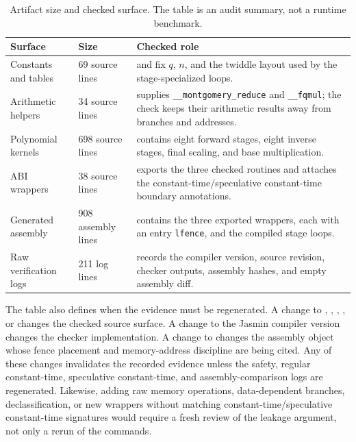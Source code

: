 \documentclass[10pt,twocolumn]{article}
\newcommand{\jasmin}{Jasmin}
\newcommand{\ct}{constant-time}
\newcommand{\sct}{speculative constant-time}
\begin{document}
\begin{table}[t]
\centering
\scriptsize
\setlength{\tabcolsep}{3pt}
\begin{tabular}{P{0.25\columnwidth}P{0.18\columnwidth}P{0.47\columnwidth}}
\toprule
Surface & Size & Checked role \\
\midrule
Constants and tables & 69 source lines &
 and  fix \(q\), \(n\), and the twiddle
layout used by the stage-specialized loops. \\
Arithmetic helpers & 34 source lines &
 supplies \texttt{\_\_montgomery\_reduce} and
\texttt{\_\_fqmul}; the check keeps their arithmetic results away from branches
and addresses. \\
Polynomial kernels & 698 source lines &
 contains eight forward stages, eight inverse stages, final
scaling, and base multiplication. \\
ABI wrappers & 38 source lines &
 exports the three checked routines and attaches the
\ct{}/\sct{} boundary annotations. \\
Generated assembly & 908 assembly lines &
 contains the three exported wrappers, each with an entry
\texttt{lfence}, and the compiled stage loops. \\
Raw verification logs & 211 log lines &
 records the compiler version, source revision, checker
outputs, assembly hashes, and empty assembly diff. \\
\bottomrule
\end{tabular}
\caption{Artifact size and checked surface.  The table is an audit summary, not
a runtime benchmark.}
\label{tab:surface}
\end{table}

The table also defines when the evidence must be regenerated.  A change to
, , ,
, or  changes the checked source surface.  A
change to the \jasmin{} compiler version changes the checker implementation.  A
change to  changes the assembly object whose fence placement and
memory-address discipline are being cited.  Any of these changes invalidates
the recorded evidence unless the safety, regular \ct{}, speculative \ct{}, and
assembly-comparison logs are regenerated.  Likewise, adding raw memory
operations, data-dependent branches, declassification, or new wrappers without
matching \ct{}/\sct{} signatures would require a fresh review of the leakage
argument, not only a rerun of the commands.
\end{document}
